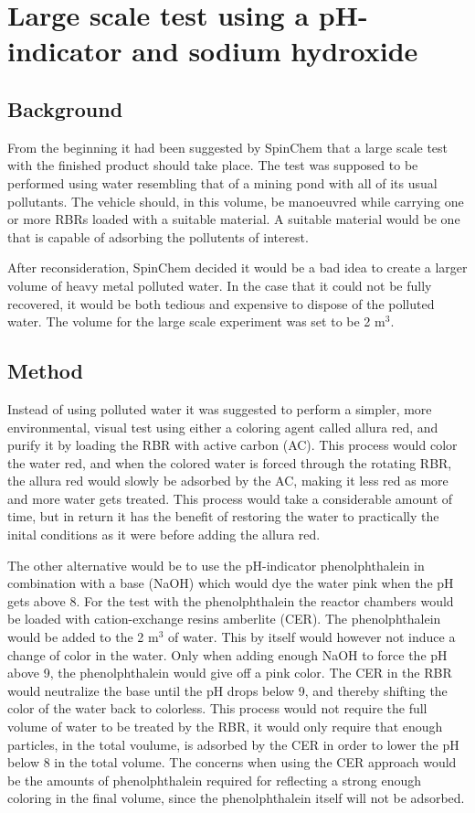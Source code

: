 \section{Large scale test using a pH-indicator and sodium hydroxide}

\subsection{Background}
From the beginning it had been suggested by SpinChem\textsuperscript{\textregistered} that a large scale test with the finished product should take place. The test was supposed to be performed using water resembling that of a mining pond with all of its usual pollutants. The vehicle should, in this volume, be manoeuvred while carrying one or more RBRs loaded with a suitable material. A suitable material would be one that is capable of adsorbing the pollutents of interest.

After reconsideration, SpinChem\textsuperscript{\textregistered} decided it would be a bad idea to create a larger volume of heavy metal polluted water. In the case that it could not be fully recovered, it would be both tedious and expensive to dispose of the polluted water. The volume for the large scale experiment was set to be 2 m$^3$.

\subsection{Method}
Instead of using polluted water it was suggested to perform a simpler, more environmental, visual test using either a coloring agent called allura red, and purify it by loading the RBR with active carbon (AC). This process would color the water red, and when the colored water is forced through the rotating RBR, the allura red would slowly be adsorbed by the AC, making it less red as more and more water gets treated. This process would take a considerable amount of time, but in return it has the benefit of restoring the water to practically the inital conditions as it were before adding the allura red.
 
The other alternative would be to use the pH-indicator phenolphthalein in combination with a base (NaOH) which would dye the water pink when the pH gets above 8. For the test with the phenolphthalein the reactor chambers would be loaded with cation-exchange resins amberlite (CER). The phenolphthalein would be added to the 2 m$^3$ of water. This by itself would however not induce a change of color in the water. Only when adding enough NaOH to force the pH above 9, the phenolphthalein would give off a pink color. The CER in the RBR would neutralize the base until the pH drops below 9, and thereby shifting the color of the water back to colorless. This process would not require the full volume of water to be treated by the RBR, it would only require that enough particles, in the total voulume, is adsorbed by the CER in order to lower the pH below 8 in the total volume. The concerns when using the CER approach would be the amounts of phenolphthalein required for reflecting a strong enough coloring in the final volume, since the phenolphthalein itself will not be adsorbed.

